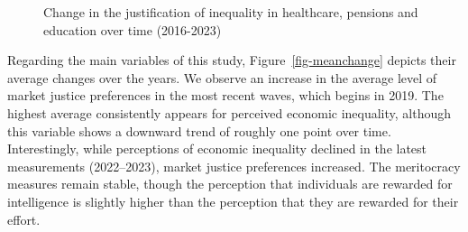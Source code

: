 \documentclass[
  12pt,
]{article}
\begin{document}
\begin{figure}[H]

\caption{\label{fig-alluvial}Change in the justification of inequality
in healthcare, pensions and education over time (2016-2023)}


\end{figure}%

Regarding the main variables of this study, Figure~\ref{fig-meanchange}
depicts their average changes over the years. We observe an increase in
the average level of market justice preferences in the most recent
waves, which begins in 2019. The highest average consistently appears
for perceived economic inequality, although this variable shows a
downward trend of roughly one point over time. Interestingly, while
perceptions of economic inequality declined in the latest measurements
(2022--2023), market justice preferences increased. The meritocracy
measures remain stable, though the perception that individuals are
rewarded for intelligence is slightly higher than the perception that
they are rewarded for their effort.
\end{document}
